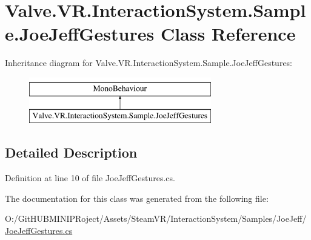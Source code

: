 \hypertarget{class_valve_1_1_v_r_1_1_interaction_system_1_1_sample_1_1_joe_jeff_gestures}{}\section{Valve.\+V\+R.\+Interaction\+System.\+Sample.\+Joe\+Jeff\+Gestures Class Reference}
\label{class_valve_1_1_v_r_1_1_interaction_system_1_1_sample_1_1_joe_jeff_gestures}
Inheritance diagram for Valve.\+V\+R.\+Interaction\+System.\+Sample.\+Joe\+Jeff\+Gestures\+:\begin{figure}[H]
\begin{center}
\leavevmode
\includegraphics[height=2.000000cm]{class_valve_1_1_v_r_1_1_interaction_system_1_1_sample_1_1_joe_jeff_gestures}
\end{center}
\end{figure}


\subsection{Detailed Description}


Definition at line 10 of file Joe\+Jeff\+Gestures.\+cs.



The documentation for this class was generated from the following file\+:\begin{DoxyCompactItemize}
\item 
O\+:/\+Git\+H\+U\+B\+M\+I\+N\+I\+P\+Roject/\+Assets/\+Steam\+V\+R/\+Interaction\+System/\+Samples/\+Joe\+Jeff/\mbox{\hyperlink{_joe_jeff_gestures_8cs}{Joe\+Jeff\+Gestures.\+cs}}\end{DoxyCompactItemize}
